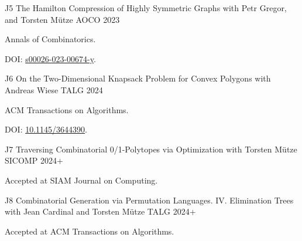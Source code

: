 \begin{cvpublications}
  \cvpublication
  {J5}
  {The Hamilton Compression of Highly Symmetric Graphs} %
  {with Petr Gregor, and Torsten Mütze} %
  {AOCO} %
  {2023}
  {
  \begin{cvitems} %
    \item  Annals of Combinatorics.
    \item[] DOI: \href{https://doi.org/10.1007/s00026-023-00674-y}{s00026-023-00674-y}.
  \end{cvitems}
  }

  \cvpublication
  {J6}
  {On the Two-Dimensional Knapsack Problem for Convex Polygons} %
  {with Andreas Wiese} %
  {TALG} %
  {2024}
  {
  \begin{cvitems} %
    \item ACM Transactions on Algorithms.
    \item[] DOI: \href{https://doi.org/10.1145/3644390}{10.1145/3644390}. 
  \end{cvitems}
  }

  \cvpublication
  {J7}
  {Traversing Combinatorial 0/1-Polytopes via Optimization} %
  {with Torsten Mütze} %
  {SICOMP} %
  {2024+}
  {
  \begin{cvitems} %
    \item Accepted at SIAM Journal on Computing.
  \end{cvitems}
  }

  \cvpublication
  {J8}
  {Combinatorial Generation via Permutation Languages. IV.  Elimination Trees} %
  {with Jean Cardinal and Torsten Mütze} %
  {TALG} %
  {2024+}
  {
  \begin{cvitems} %
    \item Accepted at ACM Transactions on Algorithms.
  \end{cvitems}
  }
\end{cvpublications}

  
\vspace{2mm}
\vspace{2mm}

